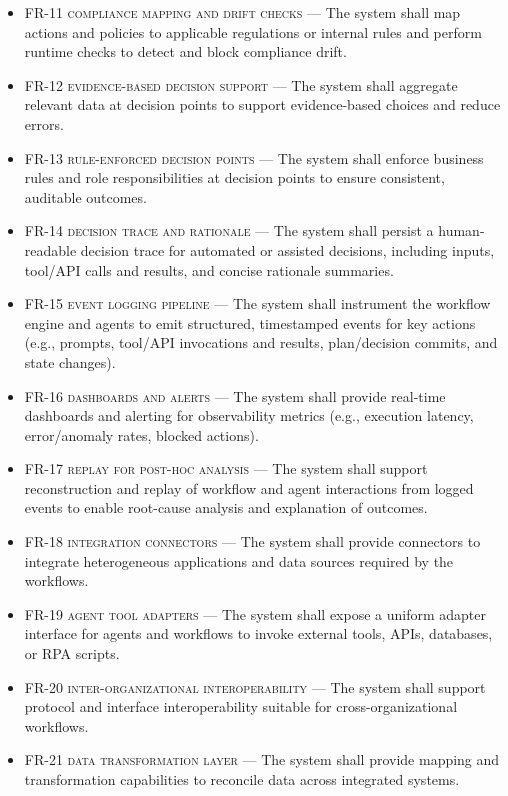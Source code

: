 \begin{footnotesize}
\begin{itemize}
        \item \textsc{FR-11 compliance mapping and drift checks} --- The system shall map actions and policies to applicable regulations or internal rules and perform runtime checks to detect and block compliance drift.
        \item \textsc{FR-12 evidence-based decision support} --- The system shall aggregate relevant data at decision points to support evidence-based choices and reduce errors.
        \item \textsc{FR-13 rule-enforced decision points} --- The system shall enforce business rules and role responsibilities at decision points to ensure consistent, auditable outcomes.
        \item \textsc{FR-14 decision trace and rationale} --- The system shall persist a human-readable decision trace for automated or assisted decisions, including inputs, tool/API calls and results, and concise rationale summaries.
        \item \textsc{FR-15 event logging pipeline} --- The system shall instrument the workflow engine and agents to emit structured, timestamped events for key actions (e.g., prompts, tool/API invocations and results, plan/decision commits, and state changes).
        \item \textsc{FR-16 dashboards and alerts} --- The system shall provide real-time dashboards and alerting for observability metrics (e.g., execution latency, error/anomaly rates, blocked actions).
        \item \textsc{FR-17 replay for post-hoc analysis} --- The system shall support reconstruction and replay of workflow and agent interactions from logged events to enable root-cause analysis and explanation of outcomes.
        \item \textsc{FR-18 integration connectors} --- The system shall provide connectors to integrate heterogeneous applications and data sources required by the workflows.
        \item \textsc{FR-19 agent tool adapters} --- The system shall expose a uniform adapter interface for agents and workflows to invoke external tools, APIs, databases, or RPA scripts.
        \item \textsc{FR-20 inter-organizational interoperability} --- The system shall support protocol and interface interoperability suitable for cross-organizational workflows.
        \item \textsc{FR-21 data transformation layer} --- The system shall provide mapping and transformation capabilities to reconcile data across integrated systems.
    \end{itemize}


\end{footnotesize}
